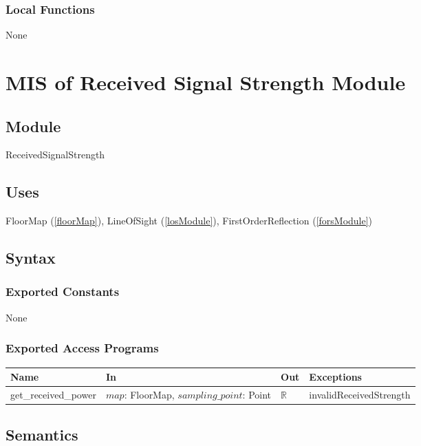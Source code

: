 \documentclass[12pt, titlepage]{article}
\begin{document}
\subsubsection{Local Functions}
None



\newpage
\section{MIS of Received Signal Strength Module} \label{rssModule}

\subsection{Module}

ReceivedSignalStrength

\subsection{Uses}
FloorMap (\autoref{floorMap}), LineOfSight (\autoref{losModule}), FirstOrderReflection (\autoref{forsModule})

\subsection{Syntax}

\subsubsection{Exported Constants} None

\subsubsection{Exported Access Programs}

\begin{center}
\begin{tabular}{p{4cm} p{4cm} p{2cm} p{2cm}}
\hline
\textbf{Name} & \textbf{In} & \textbf{Out} & \textbf{Exceptions} \\
\hline
get\_received\_power & $map$: FloorMap, $sampling\_point$: Point & $\mathbb{R}$ & invalidReceivedStrength \\

\hline
\end{tabular}
\end{center}

\subsection{Semantics}
\end{document}
